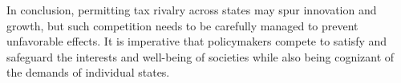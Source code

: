 In conclusion, permitting tax rivalry across states may spur innovation and growth, but such competition needs to be carefully managed to prevent unfavorable effects. It is imperative that policymakers compete to satisfy and safeguard the interests and well-being of societies while also being cognizant of the demands of individual states.